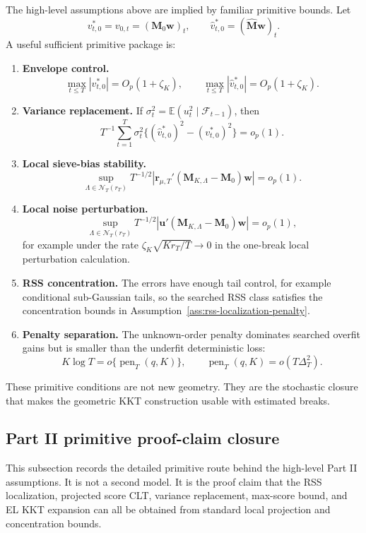 \documentclass[12pt]{article}
\numberwithin{equation}{section}
\theoremstyle{definition}
\newcommand{\E}{\mathbb E}
\newcommand{\op}{o_p}
\newcommand{\Op}{O_p}
\begin{document}
The high-level assumptions above are implied by familiar primitive bounds. Let
\[
    v^*_{t,0}=v_{0,t}=(\bm M_0\bm w)_t,
    \qquad
    \widehat v^*_{t,0}=(\widehat{\bm M}\bm w)_t.
\]
A useful sufficient primitive package is:
\begin{enumerate}[leftmargin=2em]
\item \textbf{Envelope control.}
      \[
          \max_{t\le T}|v^*_{t,0}|=\Op(1+\zeta_K),
          \qquad
          \max_{t\le T}|\widehat v^*_{t,0}|=\Op(1+\zeta_K).
      \]
\item \textbf{Variance replacement.} If
      \(\sigma_t^2=\E(u_t^2\mid\mathcal F_{t-1})\), then
      \[
          T^{-1}\sum_{t=1}^T
          \sigma_t^2\{(\widehat v^*_{t,0})^2-(v^*_{t,0})^2\}=\op(1).
      \]
\item \textbf{Local sieve-bias stability.}
      \[
          \sup_{\Lambda\in\mathcal N_T(r_T)}
          T^{-1/2}|\bm r_{\mu,T}'(\bm M_{K,\Lambda}-\bm M_0)\bm w|=\op(1).
      \]
\item \textbf{Local noise perturbation.}
      \[
          \sup_{\Lambda\in\mathcal N_T(r_T)}
          T^{-1/2}|\bm u'(\bm M_{K,\Lambda}-\bm M_0)\bm w|=\op(1),
      \]
      for example under the rate \(\zeta_K\sqrt{Kr_T/T}\to0\) in the one-break
      local perturbation calculation.
\item \textbf{RSS concentration.} The errors have enough tail control, for
      example conditional sub-Gaussian tails, so the searched RSS class satisfies
      the concentration bounds in Assumption~\ref{ass:rss-localization-penalty}.
\item \textbf{Penalty separation.} The unknown-order penalty dominates searched
      overfit gains but is smaller than the underfit deterministic loss:
      \[
          K\log T=o\{\operatorname{pen}_T(q,K)\},
          \qquad
          \operatorname{pen}_T(q,K)=o(T\Delta_T^2).
      \]
\end{enumerate}
These primitive conditions are not new geometry. They are the stochastic closure
that makes the geometric KKT construction usable with estimated breaks.
\subsection{Part II primitive proof-claim closure}

This subsection records the detailed primitive route behind the high-level
Part II assumptions. It is not a second model. It is the proof claim that the
RSS localization, projected score CLT, variance replacement, max-score bound,
and EL KKT expansion can all be obtained from standard local projection and
concentration bounds.
\end{document}
